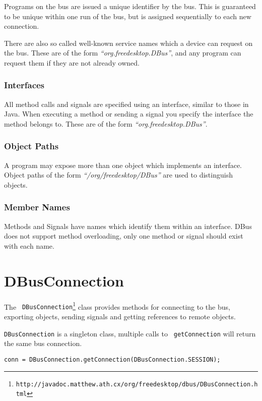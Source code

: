 \documentclass[a4paper,12pt]{article}
\begin{document}
Programs on the bus are issued a unique identifier by the bus. This
is guaranteed to be unique within one run of the bus, but is
assigned sequentially to each new connection. 

There are also so called well-known service names which a device can
request on the bus. These are of the form {\em ``org.freedesktop.DBus''},
and any program can request them if they are not already owned.

\subsubsection{Interfaces}

All method calls and signals are specified using an interface,
similar to those in Java. When executing a method or sending a
signal you specify the interface the method belongs to. These are of
the form {\em ``org.freedesktop.DBus''}.

\subsubsection{Object Paths}

A program may expose more than one object which implements an
interface. Object paths of the form {\em ``/org/freedesktop/DBus''}
are used to distinguish objects.

\subsubsection{Member Names}

Methods and Signals have names which identify them within an
interface. DBus does not support method overloading, only one
method or signal should exist with each name.

\section{DBusConnection}

The {\tt
DBusConnection\footnote{http://javadoc.matthew.ath.cx/org/freedesktop/dbus/DBusConnection.html}}
class provides methods for connecting to the bus, exporting objects,
sending signals and getting references to remote objects.

{\tt DBusConnection} is a singleton class, multiple calls to {\tt
getConnection} will return the same bus connection. 

\begin{verbatim}
conn = DBusConnection.getConnection(DBusConnection.SESSION);
\end{verbatim}
\end{document}
